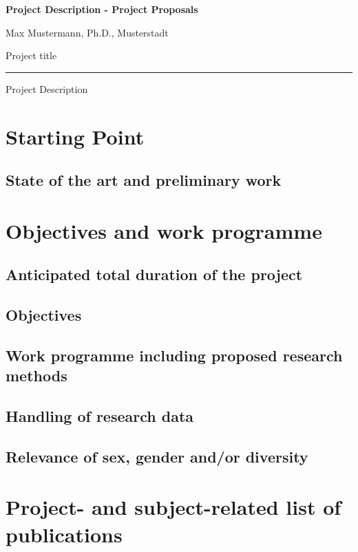 \documentclass{scrartcl}
\newcommand{\applicants}{Max Mustermann, Ph.D., Musterstadt}
\newcommand{\project}{Project title}
\begin{document}
{\raggedright{} \normalsize \bfseries 
	Project Description - Project Proposals \par
	\applicants{} \par
	\project{} \par
	\rule{\textwidth}{0.5pt} \par
	Project Description
}


\section{Starting Point}

\subsection*{State of the art and preliminary work}


\section{Objectives and work programme}

\subsection{Anticipated total duration of the project}

\subsection{Objectives}

\subsection{Work programme including proposed research methods}

\subsection{Handling of research data}

\subsection{Relevance of sex, gender and/or diversity}


\section{Project- and subject-related list of publications}
\end{document}
